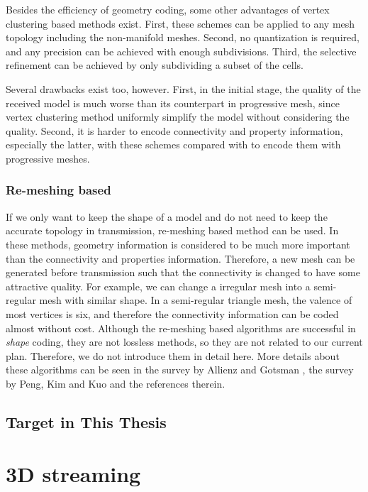 \documentclass[11pt, a4paper]{report}
\begin{document}
    Besides the efficiency of geometry coding, 
    some other advantages of vertex clustering based methods exist. 
    First, these schemes can be applied to any mesh
    topology including the non-manifold meshes. 
    Second, no quantization is required, 
    and any precision can be achieved with
    enough subdivisions. 
    Third, the selective refinement can be
    achieved by only subdividing a subset of the cells.

    Several drawbacks exist too, however. First, in the initial
    stage, the quality of the received model is much worse than its counterpart in progressive
    mesh, since vertex clustering method uniformly simplify 
    the model without considering the quality. 
    Second, it is harder to encode connectivity and property
    information, especially the latter, with these schemes compared 
    with to encode them with progressive meshes.

    \subsubsection*{Re-meshing based}
    If we only want to keep the shape of a model and do not need to
    keep the accurate topology in transmission, re-meshing based
    method can be used. In these methods, geometry information is
    considered to be much more important than the connectivity and properties
    information. Therefore, a new mesh can be generated before
    transmission such that the connectivity is changed to have some
    attractive quality. For example, we can change a irregular mesh
    into a semi-regular mesh with similar shape. In a semi-regular
    triangle mesh, the valence of most vertices is six, and therefore
    the connectivity information can be coded almost without cost.
    Although the re-meshing based algorithms are successful in
    \emph{shape} coding, they are not lossless methods, so they are
    not related to our current plan. 
    Therefore, we do not introduce them in detail here. 
    More details about these algorithms can be seen in the survey by Allienz and Gotsman
    \cite{recent:alliez}, the survey by Peng, Kim and Kuo
    \cite{technologies:peng} and the references therein.
    \subsection{Target in This Thesis}
    \section{3D streaming}
\end{document}
